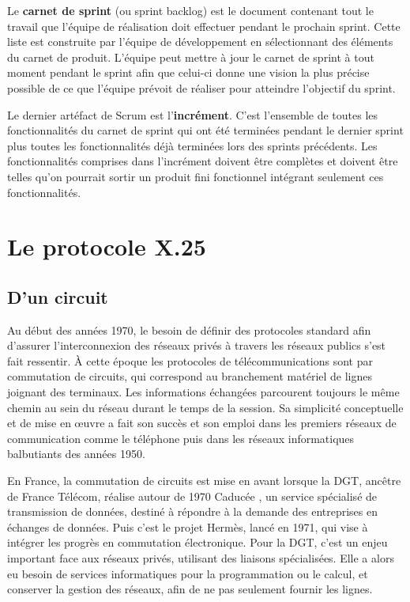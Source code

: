 \documentclass[12pt]{report}
\begin{document}
Le \textbf{carnet de sprint} (ou sprint backlog) est le document contenant tout le travail que l'équipe de réalisation doit effectuer pendant le prochain sprint.
Cette liste est construite par l'équipe de développement en sélectionnant des éléments du carnet de produit. L'équipe peut mettre à jour le carnet de sprint à tout moment pendant le sprint afin que celui-ci donne une vision la plus précise possible de ce que l'équipe prévoit de réaliser pour atteindre l'objectif du sprint.

Le dernier artéfact de Scrum est l'\textbf{incrément}. C'est l'ensemble de toutes les fonctionnalités du carnet de sprint qui ont été terminées pendant le dernier sprint plus toutes les fonctionnalités déjà terminées lors des sprints précédents. Les fonctionnalités comprises dans l'incrément doivent être complètes et doivent être telles qu'on pourrait sortir un produit fini fonctionnel intégrant seulement ces fonctionnalités.

\chapter{Le protocole X.25}

\section{D'un circuit}

Au début des années 1970, le besoin de définir des protocoles standard afin d'assurer l'interconnexion des réseaux privés à travers les réseaux publics s'est fait ressentir.
À cette époque les protocoles de télécommunications sont par commutation de circuits, qui correspond au branchement matériel de lignes joignant des terminaux. Les informations échangées parcourent toujours le même chemin au sein du réseau durant le temps de la session. Sa simplicité conceptuelle et de mise en œuvre a fait son succès et son emploi dans les premiers réseaux de communication comme le téléphone puis dans les réseaux informatiques balbutiants des années 1950\cite{wikicc}.

En France, la commutation de circuits est mise en avant lorsque la \gls{DGT}, ancêtre de France Télécom, réalise autour de 1970 \og Caducée \fg, un service spécialisé de transmission de données, destiné à répondre à la demande des entreprises en échanges de données. Puis c'est le projet Hermès, lancé en 1971, qui vise à intégrer les progrès en commutation électronique. Pour la DGT, c'est un enjeu important face aux réseaux privés, utilisant des liaisons spécialisées. Elle a alors eu besoin de services informatiques pour la programmation ou le calcul, et conserver la gestion des réseaux, afin de ne pas seulement fournir les lignes.
\end{document}
